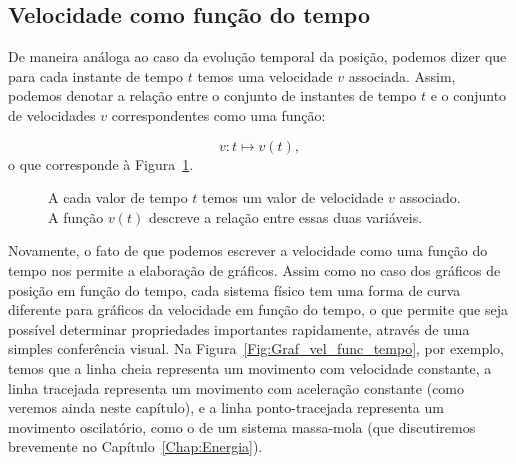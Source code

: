 \subsection{Velocidade como função do tempo}

De maneira análoga ao caso da evolução temporal da posição, podemos dizer que para cada instante de tempo $t$ temos uma velocidade $v$ associada. Assim, podemos denotar a relação entre o conjunto de instantes de tempo $t$ e o conjunto de velocidades $v$ correspondentes como uma função:

\begin{equation}
    v: t \mapsto v(t),
\end{equation}
%
o que corresponde à Figura~\ref{Fig:GrafVelFuncTempoDiversasCurvas}.
\begin{figure}
\centering
{}
\caption{A cada valor de tempo $t$ temos um valor de velocidade $v$ associado. A função $v(t)$ descreve a relação entre essas duas variáveis.\label{Fig:GrafVelFuncTempoDiversasCurvas}}
\end{figure}

Novamente, o fato de que podemos escrever a velocidade como uma função do tempo nos permite a elaboração de gráficos. Assim como no caso dos gráficos de posição em função do tempo, cada sistema físico tem uma forma de curva diferente para gráficos da velocidade em função do tempo, o que permite que seja possível determinar propriedades importantes rapidamente, através de uma simples conferência visual. Na Figura~\ref{Fig:Graf_vel_func_tempo}, por exemplo, temos que a linha cheia representa um movimento com velocidade constante, a linha tracejada representa um movimento com aceleração constante (como veremos ainda neste capítulo), e a linha ponto-tracejada representa um movimento oscilatório, como o de um sistema massa-mola (que discutiremos brevemente no Capítulo~\ref{Chap:Energia}).

